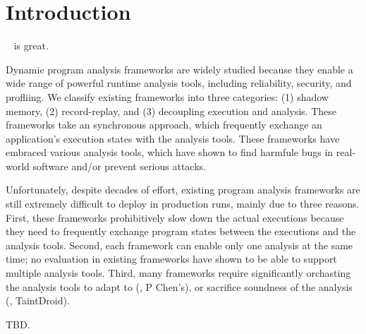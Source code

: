 \section{Introduction} \label{sec:intro}

\paxos~\cite{paxos} is great.


Dynamic program analysis frameworks are widely studied because they enable a 
wide range of powerful runtime analysis tools, including reliability, security, 
and profliing. We classify existing frameworks into three categories: (1) 
shadow memory, (2) record-replay, and (3) decoupling execution and 
analysis. These frameworks take an synchronous approach, which frequently 
exchange an application's execution states with the analysis tools. These 
frameworks have embraced various analysis tools, which have shown to find 
harmfule bugs in real-world software and/or prevent serious attacks.





Unfortunately, despite decades of effort, existing program analysis frameworks 
are still extremely difficult to deploy in production runs, mainly due to three 
reasons. First, these frameworks prohibitively slow down the actual executions 
because they need to frequently exchange program states between the executions 
and the analysis tools. Second, each framework can enable only one analysis at 
the same time; no evaluation in existing frameworks have shown to be able to 
support multiple analysis tools. Third, many frameworks require significantly 
orchasting the analysis tools to adapt to (\eg, P Chen's), or sacrifice 
soundness of the analysis (\eg, TaintDroid).

TBD.

